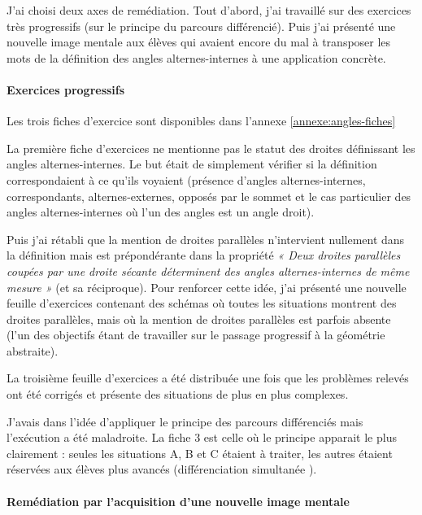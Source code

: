 J'ai choisi deux axes de remédiation. Tout d'abord, j'ai travaillé sur des exercices très progressifs (sur le principe du parcours différencié). Puis j'ai présenté une nouvelle image mentale aux élèves qui avaient encore du mal à transposer les mots de la définition des angles alternes-internes à une application concrète.

\paragraph{Exercices progressifs}

Les trois fiches d'exercice sont disponibles dans l'annexe \ref{annexe:angles-fiches}

La première fiche d'exercices ne mentionne pas le statut des droites définissant les angles alternes-internes. Le but était de simplement vérifier si la définition correspondaient à ce qu'ils voyaient (présence d'angles alternes-internes, correspondants, alternes-externes, opposés par le sommet et le cas particulier des angles alternes-internes où l'un des angles est un angle droit).

Puis j'ai rétabli que la mention de droites parallèles n'intervient nullement dans la définition mais est prépondérante dans la propriété \textit{« Deux droites parallèles coupées par une droite sécante déterminent des angles alternes-internes de même mesure »} (et sa réciproque). Pour renforcer cette idée, j'ai présenté une nouvelle feuille d'exercices contenant des schémas où toutes les situations montrent des droites parallèles, mais où la mention de droites parallèles est parfois absente (l'un des objectifs étant de travailler sur le passage progressif à la géométrie abstraite).

La troisième feuille d'exercices a été distribuée une fois que les problèmes relevés ont été corrigés et présente des situations de plus en plus complexes.

J'avais dans l'idée d'appliquer le principe des parcours différenciés mais l'exécution a été maladroite. La fiche 3 est celle où le principe apparait le plus clairement : seules les situations A, B et C étaient à traiter, les autres étaient réservées aux élèves plus avancés (différenciation simultanée \cite{Eduscol}).

\paragraph{Remédiation par l'acquisition d'une nouvelle image mentale}

